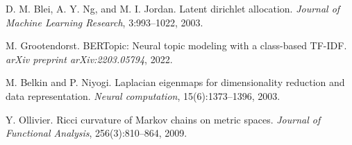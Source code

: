 \documentclass[11pt, letterpaper]{article}
\begin{document}



\begin{thebibliography}{9}
D. M. Blei, A. Y. Ng, and M. I. Jordan.
\newblock Latent dirichlet allocation.
\newblock \emph{Journal of Machine Learning Research}, 3:993--1022, 2003.

M. Grootendorst.
\newblock BERTopic: Neural topic modeling with a class-based TF-IDF.
\newblock \emph{arXiv preprint arXiv:2203.05794}, 2022.

M. Belkin and P. Niyogi.
\newblock Laplacian eigenmaps for dimensionality reduction and data representation.
\newblock \emph{Neural computation}, 15(6):1373--1396, 2003.

Y. Ollivier.
\newblock Ricci curvature of Markov chains on metric spaces.
\newblock \emph{Journal of Functional Analysis}, 256(3):810--864, 2009.

\end{thebibliography}
\end{document}
